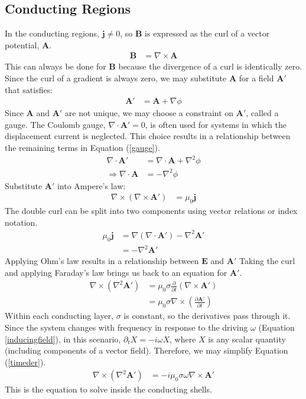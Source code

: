 \documentclass{article}
\begin{document}
\subsection*{Conducting Regions}
In the conducting regions, $\mathbf{j}\neq0$, so $\mathbf{B}$ is expressed as the curl of a vector potential, $\mathbf{A}$.
\begin{align}
    \mathbf{B} &= \nabla\times\mathbf{A}
\end{align}
This can always be done for $\mathbf{B}$ because the divergence of a curl is identically zero. Since the curl of a gradient is always zero, we may substitute $\mathbf{A}$ for a field $\mathbf{A}'$ that satisfies:
\begin{align}
    \mathbf{A}' &= \mathbf{A} + \nabla\phi \label{gauge}
\end{align}
Since $\mathbf{A}$ and $\mathbf{A}'$ are not unique, we may choose a constraint on $\mathbf{A}'$, called a gauge. The Coulomb gauge, $\nabla\cdot\mathbf{A}'=0$, is often used for systems in which the displacement current is neglected. This choice results in a relationship between the remaining terms in Equation (\ref{gauge}).
\begin{align}
    \nabla\cdot\mathbf{A}' &= \nabla\cdot\mathbf{A} + \nabla^2\phi \\
    \Longrightarrow \nabla\cdot\mathbf{A} &= -\nabla^2\phi
\end{align}
Substitute $\mathbf{A}'$ into Ampere's law:
\begin{align}
    \nabla\times(\nabla\times\mathbf{A}') &= \mu_0\mathbf{j}
\end{align}
The double curl can be split into two components using vector relations or index notation.
\begin{align}
    \mu_0\mathbf{j} &= \nabla(\nabla\cdot\mathbf{A}') - \nabla^2\mathbf{A}' \\
    &= - \nabla^2\mathbf{A}'
\end{align}
Applying Ohm's law results in a relationship between $\mathbf{E}$ and $\mathbf{A}'$ Taking the curl and applying Faraday's law brings us back to an equation for $\mathbf{A}'$.
\begin{align}
    \nabla\times(\nabla^2\mathbf{A}') &= \mu_0\sigma\frac{\partial}{\partial t}(\nabla\times\mathbf{A}') \\
    &= \mu_0\sigma\nabla\times\left(\frac{\partial\mathbf{A}'}{\partial t}\right) \label{timeder}
\end{align}
Within each conducting layer, $\sigma$ is constant, so the derivatives pass through it. Since the system changes with frequency in response to the driving $\omega$ (Equation \ref{inducingfield}), in this scenario, $\partial_t X = -i\omega X$, where $X$ is any scalar quantity (including components of a vector field). Therefore, we may simplify Equation (\ref{timeder}).
\begin{align}
    \nabla\times(\nabla^2\mathbf{A}') &= -i\mu_0\sigma\omega\nabla\times\mathbf{A}'
\end{align}
This is the equation to solve inside the conducting shells.
\end{document}
